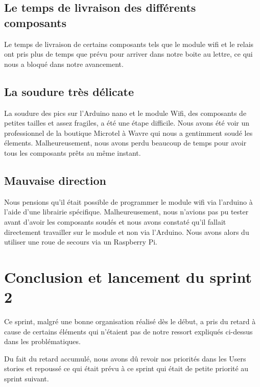 \subsection{Le temps de livraison des différents composants} 

Le temps de livraison de certains composants tels que le module wifi et le relais ont pris plus de temps que prévu pour arriver dans notre boite au lettre, ce qui nous a bloqué dans notre avancement.
\subsection{La soudure très délicate} 
La soudure des pics sur l'Arduino nano et le module Wifi, des composants de petites tailles et assez fragiles, a été une étape difficile. Nous avons été voir un professionnel de la boutique Microtel à Wavre qui nous a gentimment soudé les élements. Malheureusement, nous avons perdu beaucoup de temps pour avoir tous les composants prêts au même instant.  

\subsection{Mauvaise direction} 
Nous pensions qu'il était possible de programmer le module wifi via l'arduino à l'aide d'une librairie spécifique. Malheureusement, nous n'avions pas pu tester avant d'avoir les composants soudés et nous avons constaté qu'il fallait directement travailler sur le module et non via l'Arduino. Nous avons alors du utiliser une roue de secours via un Raspberry Pi. 
 

\section{Conclusion et lancement du sprint 2}

Ce sprint, malgré une bonne organisation réalisé dès le début, a pris du retard à cause de certains éléments qui n'étaient pas de notre ressort expliqués ci-dessus dans les problématiques. 

Du fait du retard accumulé, nous avons dû revoir nos priorités dans les Users stories et repoussé ce qui était prévu à ce sprint qui était de petite priorité au sprint suivant. 





	
